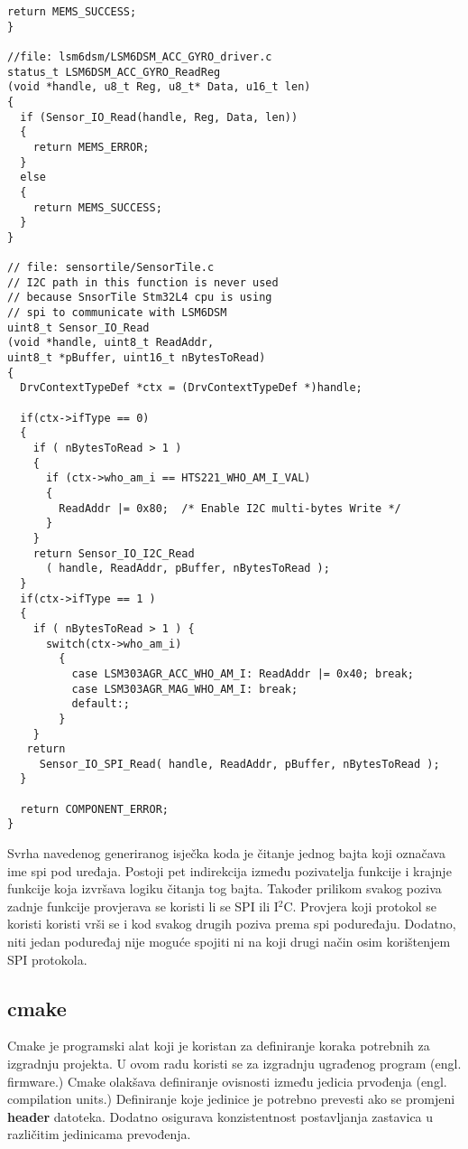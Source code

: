 \documentclass[times, utf8, diplomski]{diplomski}
\begin{document}
\begin{lstlisting}[caption={Primjer geneririranog koda kojeg generira Stm32CUBE IDE}, label={badcode}, basicstyle={\ttfamily\footnotesize\tiny}]
  return MEMS_SUCCESS;
}

//file: lsm6dsm/LSM6DSM_ACC_GYRO_driver.c
status_t LSM6DSM_ACC_GYRO_ReadReg
(void *handle, u8_t Reg, u8_t* Data, u16_t len)
{
  if (Sensor_IO_Read(handle, Reg, Data, len))
  {
    return MEMS_ERROR;
  }
  else
  {
    return MEMS_SUCCESS;
  }
}

// file: sensortile/SensorTile.c
// I2C path in this function is never used
// because SnsorTile Stm32L4 cpu is using
// spi to communicate with LSM6DSM
uint8_t Sensor_IO_Read
(void *handle, uint8_t ReadAddr,
uint8_t *pBuffer, uint16_t nBytesToRead)
{
  DrvContextTypeDef *ctx = (DrvContextTypeDef *)handle;

  if(ctx->ifType == 0)
  {
    if ( nBytesToRead > 1 )
    {
      if (ctx->who_am_i == HTS221_WHO_AM_I_VAL)
      {
        ReadAddr |= 0x80;  /* Enable I2C multi-bytes Write */
      }
    }
    return Sensor_IO_I2C_Read
      ( handle, ReadAddr, pBuffer, nBytesToRead );
  }
  if(ctx->ifType == 1 )
  {
    if ( nBytesToRead > 1 ) {
      switch(ctx->who_am_i)
        {
          case LSM303AGR_ACC_WHO_AM_I: ReadAddr |= 0x40; break;
          case LSM303AGR_MAG_WHO_AM_I: break;
          default:;
        }
    }
   return
     Sensor_IO_SPI_Read( handle, ReadAddr, pBuffer, nBytesToRead );
  }

  return COMPONENT_ERROR;
}
\end{lstlisting}

Svrha navedenog generiranog isječka koda je čitanje jednog bajta koji označava ime spi pod uređaja. Postoji pet indirekcija između pozivatelja funkcije i krajnje funkcije koja izvršava logiku čitanja tog bajta. Također prilikom svakog poziva zadnje funkcije provjerava se koristi li se SPI ili I\(^2\)C. Provjera koji protokol se koristi koristi vrši se i kod svakog drugih poziva prema spi poduređaju. Dodatno, niti jedan poduređaj nije moguće spojiti ni na koji drugi način osim korištenjem SPI protokola.

\subsection{cmake}
Cmake je programski alat koji je koristan za definiranje koraka potrebnih za izgradnju projekta. U ovom radu koristi se za izgradnju ugrađenog program (engl. firmware.) Cmake olakšava definiranje ovisnosti između jedicia prvođenja (engl. compilation units.) Definiranje koje jedinice je potrebno prevesti ako se promjeni \textbf{header} datoteka. Dodatno osigurava konzistentnost postavljanja zastavica u različitim jedinicama prevođenja.
\end{document}
